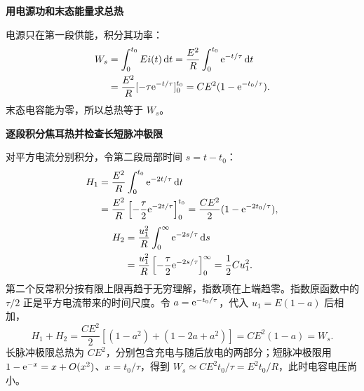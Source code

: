 \begin{solution}
\par\medskip{}\noindent\textbf{用电源功和末态能量求总热}\par\nobreak
电源只在第一段供能，积分其功率：
\[
 \begin{aligned}
 W_s&=\int_0^{t_0}Ei(t)\mathop{}\!\mathrm d t
 =\frac{E^2}{R}\int_0^{t_0}\mathrm e^{-t/\tau}\mathop{}\!\mathrm d t\\
 &=\frac{E^2}{R}[-\tau\mathrm e^{-t/\tau}]_0^{t_0}
 =CE^2(1-\mathrm e^{-t_0/\tau}).
 \end{aligned}
\]
末态电容能为零，所以总热等于 $W_s$。



\par\medskip{}\noindent\textbf{逐段积分焦耳热并检查长短脉冲极限}\par\nobreak
对平方电流分别积分，令第二段局部时间 $s=t-t_0$：
\[
\begin{aligned}
H_1&=\frac{E^2}{R}\int_0^{t_0}\mathrm e^{-2t/\tau}\mathop{}\!\mathrm d t\\
&=\frac{E^2}{R}\left[-\frac\tau2\mathrm e^{-2t/\tau}\right]_0^{t_0}
=\frac{CE^2}{2}(1-\mathrm e^{-2t_0/\tau}),
\end{aligned}
\]
\[
\begin{aligned}
H_2&=\frac{u_1^2}{R}\int_0^\infty\mathrm e^{-2s/\tau}\mathop{}\!\mathrm d s\\
&=\frac{u_1^2}{R}\left[-\frac\tau2\mathrm e^{-2s/\tau}\right]_0^\infty
=\frac12Cu_1^2.
\end{aligned}
\]
第二个反常积分按有限上限再趋于无穷理解，指数项在上端趋零。指数原函数中的 $\tau/2$ 正是平方电流带来的时间尺度。令 $a=\mathrm e^{-t_0/\tau}$，代入 $u_1=E(1-a)$ 后相加，
\[
 H_1+H_2=\frac{CE^2}{2}[(1-a^2)+(1-2a+a^2)]
 =CE^2(1-a)=W_s.
\]
长脉冲极限总热为 $CE^2$，分别包含充电与随后放电的两部分；短脉冲极限用 $1-\mathrm e^{-x}=x+O(x^2)$、$x=t_0/\tau$，得到 $W_s\simeq CE^2t_0/\tau=E^2t_0/R$，此时电容电压尚小。
\end{solution}
